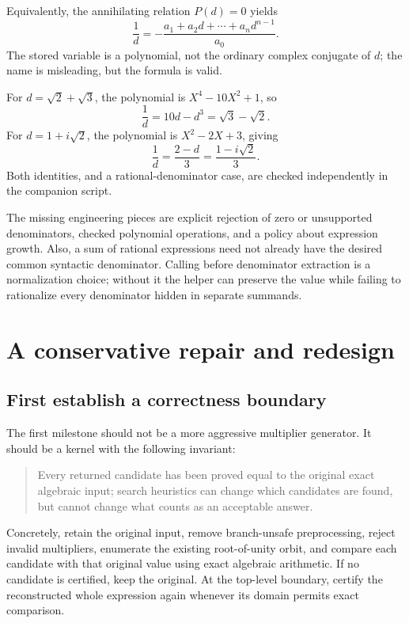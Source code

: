 \documentclass[11pt,letterpaper]{article}
\newcommand{\code}[1]{\texttt{\detokenize{#1}}}
\theoremstyle{definition}
\begin{document}
Equivalently, the annihilating relation $P(d)=0$ yields
\begin{equation}
 \frac1d=-\frac{a_1+a_2d+\cdots+a_nd^{n-1}}{a_0}.
 \label{eq:inverse}
\end{equation}
The stored variable \code{conjugate} is a polynomial, not the ordinary complex
conjugate of $d$; the name is misleading, but the formula is valid.

For $d=\sqrt2+\sqrt3$, the polynomial is $X^4-10X^2+1$, so
\[
 \frac1d=10d-d^3=\sqrt3-\sqrt2.
\]
For $d=1+i\sqrt2$, the polynomial is $X^2-2X+3$, giving
\[
 \frac1d=\frac{2-d}{3}=\frac{1-i\sqrt2}{3}.
\]
Both identities, and a rational-denominator case, are checked independently in the
companion script.

The missing engineering pieces are explicit rejection of zero or unsupported
denominators, checked polynomial operations, and a policy about expression growth.
Also, a sum of rational expressions need not already have the desired common
syntactic denominator. Calling \code{Together} before denominator extraction is a
normalization choice; without it the helper can preserve the value while failing
to rationalize every denominator hidden in separate summands.

\section{A conservative repair and redesign}
\label{sec:repair}

\subsection{First establish a correctness boundary}
The first milestone should not be a more aggressive multiplier generator. It should
be a kernel with the following invariant:
\begin{quote}
Every returned candidate has been proved equal to the original exact algebraic
input; search heuristics can change which candidates are found, but cannot change
what counts as an acceptable answer.
\end{quote}
Concretely, retain the original input, remove branch-unsafe preprocessing, reject
invalid multipliers, enumerate the existing root-of-unity orbit, and compare each
candidate with that original value using exact algebraic arithmetic. If no candidate
is certified, keep the original. At the top-level boundary, certify the reconstructed
whole expression again whenever its domain permits exact comparison.
\end{document}
